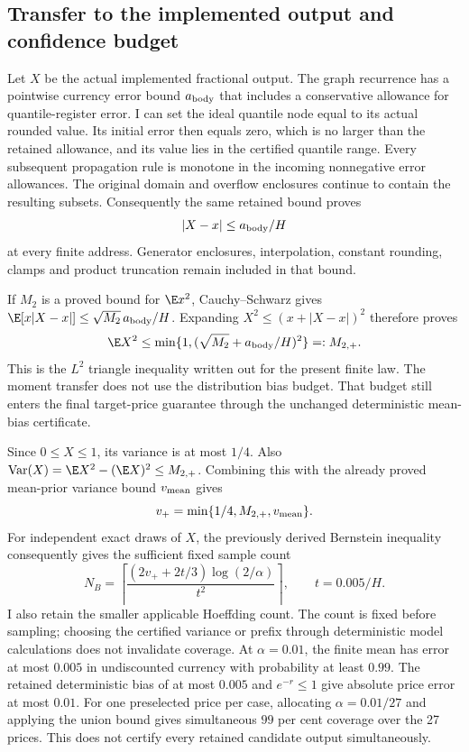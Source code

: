 \subsection{Transfer to the implemented output and confidence budget}

Let $X$ be the actual implemented fractional output. The graph recurrence
has a pointwise currency error bound $a_{\rm body}$ that includes a
conservative allowance for quantile-register error. I can set the ideal
quantile node equal to its actual rounded value. Its initial error then
equals zero, which is no larger than the retained allowance, and its value
lies in the certified quantile range. Every subsequent propagation rule is
monotone in the incoming nonnegative error allowances. The original domain
and overflow enclosures continue to contain the resulting subsets.
Consequently the same retained bound proves
\begin{equation}
 |X-x|\leq a_{\rm body}/H
\end{equation}
at every finite address. Generator enclosures, interpolation, constant
rounding, clamps and product truncation remain included in that bound.

If $M_2$ is a proved bound for $\E x^2$, Cauchy--Schwarz gives
$\E[x|X-x|]\leq\sqrt{M_2}\,a_{\rm body}/H$. Expanding
$X^2\leq(x+|X-x|)^2$ therefore proves
\begin{equation}\label{eq:finite-second-transfer}
 \E X^2\leq\min\{1,(\sqrt{M_2}+a_{\rm body}/H)^2\}=:M_{2,+}.
\end{equation}
This is the $L^2$ triangle inequality written out for the present finite
law. The moment transfer does not use the distribution bias budget. That
budget still enters the final target-price guarantee through the unchanged
deterministic mean-bias certificate.

Since $0\leq X\leq1$, its variance is at most $1/4$. Also
$\operatorname{Var}(X)=\E X^2-(\E X)^2\leq M_{2,+}$.
Combining this with the already proved mean-prior variance bound
$v_{\rm mean}$ gives
\begin{equation}
 v_+=\min\{1/4,M_{2,+},v_{\rm mean}\}.
\end{equation}
For independent exact draws of $X$, the previously derived Bernstein
inequality consequently gives the sufficient fixed sample count
\begin{equation}\label{eq:finite-variance-samples}
 N_B=\left\lceil
 \frac{(2v_++2t/3)\log(2/\alpha)}{t^2}\right\rceil,
 \qquad t=0.005/H.
\end{equation}
I also retain the smaller applicable Hoeffding count. The count is fixed
before sampling; choosing the certified variance or prefix through
deterministic model calculations does not invalidate coverage. At
$\alpha=0.01$, the finite mean has error at most $0.005$ in undiscounted
currency with probability at least $0.99$. The retained deterministic bias
of at most $0.005$ and $e^{-r}\leq1$ give absolute price error at most
$0.01$. For one preselected price per case, allocating
$\alpha=0.01/27$ and applying the union bound gives simultaneous
$99$ per cent coverage over the 27 prices. This does not certify every
retained candidate output simultaneously.

